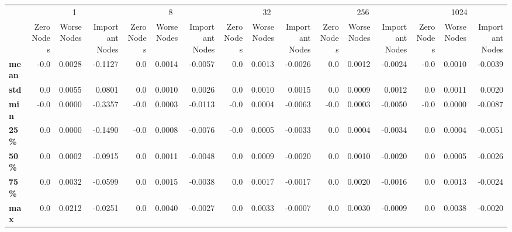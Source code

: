\begin{tabular}{lrrrrrrrrrrrrrrr}
\toprule
{} & \multicolumn{3}{c}{1} & \multicolumn{3}{c}{8} & \multicolumn{3}{c}{32} & \multicolumn{3}{c}{256} & \multicolumn{3}{c}{1024} \\
{} & Zero Nodes & Worse Nodes & Important Nodes & Zero Nodes & Worse Nodes & Important Nodes & Zero Nodes & Worse Nodes & Important Nodes & Zero Nodes & Worse Nodes & Important Nodes & Zero Nodes & Worse Nodes & Important Nodes \\
\midrule
\textbf{mean} &       -0.0 &      0.0028 &         -0.1127 &        0.0 &      0.0014 &         -0.0057 &        0.0 &      0.0013 &         -0.0026 &        0.0 &      0.0012 &         -0.0024 &       -0.0 &      0.0010 &         -0.0039 \\
\textbf{std } &        0.0 &      0.0055 &          0.0801 &        0.0 &      0.0010 &          0.0026 &        0.0 &      0.0010 &          0.0015 &        0.0 &      0.0009 &          0.0012 &        0.0 &      0.0011 &          0.0020 \\
\textbf{min } &       -0.0 &      0.0000 &         -0.3357 &       -0.0 &      0.0003 &         -0.0113 &       -0.0 &      0.0004 &         -0.0063 &       -0.0 &      0.0003 &         -0.0050 &       -0.0 &      0.0000 &         -0.0087 \\
\textbf{25\% } &        0.0 &      0.0000 &         -0.1490 &       -0.0 &      0.0008 &         -0.0076 &       -0.0 &      0.0005 &         -0.0033 &        0.0 &      0.0004 &         -0.0034 &        0.0 &      0.0004 &         -0.0051 \\
\textbf{50\% } &        0.0 &      0.0002 &         -0.0915 &        0.0 &      0.0011 &         -0.0048 &        0.0 &      0.0009 &         -0.0020 &        0.0 &      0.0010 &         -0.0020 &        0.0 &      0.0005 &         -0.0026 \\
\textbf{75\% } &        0.0 &      0.0032 &         -0.0599 &        0.0 &      0.0015 &         -0.0038 &        0.0 &      0.0017 &         -0.0017 &        0.0 &      0.0020 &         -0.0016 &        0.0 &      0.0013 &         -0.0024 \\
\textbf{max } &        0.0 &      0.0212 &         -0.0251 &        0.0 &      0.0040 &         -0.0027 &        0.0 &      0.0033 &         -0.0007 &        0.0 &      0.0030 &         -0.0009 &        0.0 &      0.0038 &         -0.0020 \\
\bottomrule
\end{tabular}
